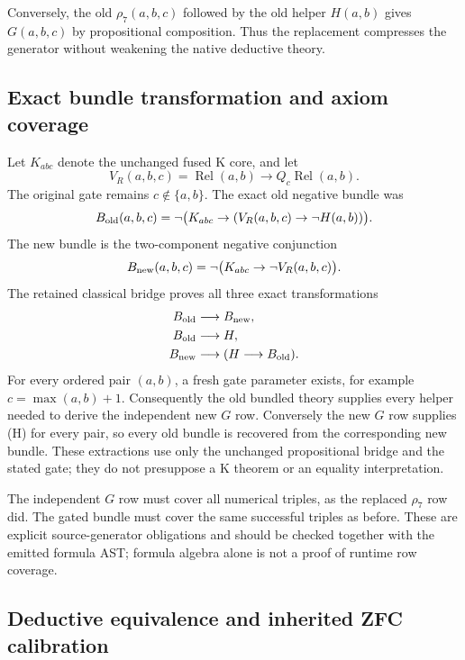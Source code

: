 Conversely, the old $\rho_7(a,b,c)$ followed by the old helper $H(a,b)$
gives $G(a,b,c)$ by propositional composition.  Thus the replacement
compresses the generator without weakening the native deductive theory.

\subsection{Exact bundle transformation and axiom coverage}

Let $K_{abc}$ denote the unchanged fused K core, and let
\[
 V_R(a,b,c)=
   \operatorname{Rel}(a,b)\longrightarrow
       Q_c\operatorname{Rel}(a,b).
\]
The original gate remains $c\notin\{a,b\}$.
The exact old negative bundle was
\[
 B_{\rm old}(a,b,c)=
  \neg\bigl(K_{abc}\to(V_R(a,b,c)\to\neg H(a,b))\bigr).
\]
The new bundle is the two-component negative conjunction
\[
 B_{\rm new}(a,b,c)=
  \neg\bigl(K_{abc}\to\neg V_R(a,b,c)\bigr).
\]
The retained classical bridge proves all three exact transformations
\[
\begin{aligned}
 B_{\rm old}&\longrightarrow B_{\rm new},\\
 B_{\rm old}&\longrightarrow H,\\
 B_{\rm new}&\longrightarrow(H\longrightarrow B_{\rm old}).
\end{aligned}
\]
For every ordered pair $(a,b)$, a fresh gate parameter exists, for example
$c=\max(a,b)+1$.  Consequently the old bundled theory supplies every
helper needed to derive the independent new $G$ row.  Conversely the new
$G$ row supplies (H) for every pair, so every old bundle is recovered from
the corresponding new bundle.  These extractions use only the unchanged
propositional bridge and the stated gate; they do not presuppose a K
theorem or an equality interpretation.

The independent $G$ row must cover all numerical triples, as the replaced
$\rho_7$ row did.  The gated bundle must cover the same successful triples
as before.  These are explicit source-generator obligations and should be
checked together with the emitted formula AST; formula algebra alone is
not a proof of runtime row coverage.

\subsection{Deductive equivalence and inherited ZFC calibration}

